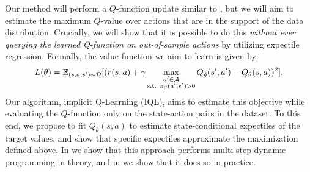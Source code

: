 \documentclass{article} %
\def\ourname{IQL\xspace}
\def\ournamepref{implicit\xspace}
\begin{document}
Our method will perform a $Q$-function update similar to , but we will aim to estimate the maximum $Q$-value over actions that are in the support of the data distribution. Crucially, we will show that it is possible to do this \emph{without ever querying the learned Q-function on out-of-sample actions} by utilizing expectile regression. Formally, the value function we aim to learn is given by:
\begin{equation}
L(\theta) = \mathbb{E}_{(s, a, s')\sim\mathcal{D}}[(r(s,a) + \gamma  \max_{\substack{a'\in \mathcal{A} \\\text{s.t. }\pi_\beta(a'|s') > 0}}Q_{\hat{\theta}}(s',a') - Q_\theta(s,a))^2].
\label{eqn:bq_learning}
\end{equation}
Our algorithm, \ournamepref Q-Learning (\ourname), aims to estimate this objective while evaluating the $Q$-function only on the state-action pairs in the dataset. To this end, we propose to fit $Q_\theta(s,a)$ to estimate state-conditional expectiles of the target values, and show that
specific expectiles approximate the maximization defined above.
In  we show that this approach performs multi-step dynamic programming in theory, and in  we show that it does so in practice.
\end{document}
